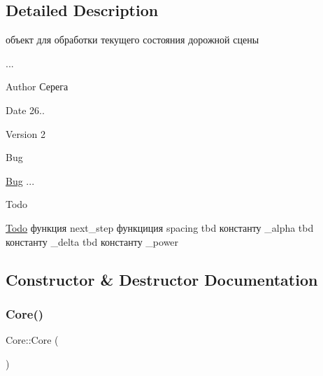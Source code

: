 \subsection{Detailed Description}
объект для обработки текущего состояния дорожной сцены 

... \begin{DoxyAuthor}{Author}
Серега 
\end{DoxyAuthor}
\begin{DoxyDate}{Date}
26.. 
\end{DoxyDate}
\begin{DoxyVersion}{Version}
2 
\end{DoxyVersion}
\begin{DoxyRefDesc}{Bug}
\item[\hyperlink{bug__bug000001}{Bug}]... \end{DoxyRefDesc}
\begin{DoxyRefDesc}{Todo}
\item[\hyperlink{todo__todo000001}{Todo}]функция next\+\_\+step функциция spacing tbd константу \+\_\+alpha tbd константу \+\_\+delta tbd константу \+\_\+power \end{DoxyRefDesc}


\subsection{Constructor \& Destructor Documentation}
\mbox{\label{class_n_a_m_e_s_p_a_c_e_1_1_core_a14e63188e0aa7c4a6f72d5501384d1f9}} 
\subsubsection{\texorpdfstring{Core()}{Core()}\hspace{0.1cm}{\footnotesize\ttfamily [1/2]}}
{\footnotesize\ttfamily Core\+::\+Core (\begin{DoxyParamCaption}{ }\end{DoxyParamCaption})}

\mbox{\label{class_n_a_m_e_s_p_a_c_e_1_1_core_a5afb68389500c9f0537e852e486501b7}} 
